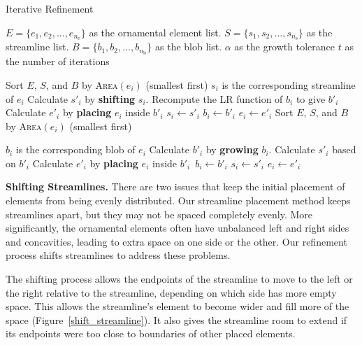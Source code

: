 \begin{algorithm}
\caption{Iterative Refinement} 
\label{iterative_refinement_algorithm}
\begin{algorithmic} 
\REQUIRE $E = \{ e_{1}, e_{2},... , e_{n_\mathrm{e}} \}$ as the ornamental element list. 
\REQUIRE $S = \{ s_{1}, s_{2},... , s_{n_\mathrm{s}} \}$ as the streamline list.
\REQUIRE $B = \{ b_{1}, b_{2},... , b_{n_\mathrm{b}} \}$ as the blob list.
\REQUIRE $\alpha$ as the growth tolerance
\REQUIRE $t$ as the number of iterations

  \STATE Sort $E$, $S$, and $B$ by \textsc{Area}$(e_{i})$ (smallest first)
  	\STATE $s_{i}$ is the corresponding streamline of $e_{i}$
    \STATE Calculate $s'_{i}$ by \textbf{shifting} $s_{i}$.
    \STATE Recompute the LR function of $b_{i}$ to give $b'_{i}$
    \STATE Calculate $e'_{i}$ by \textbf{placing} $e_{i}$ inside $b'_{i}$
        \STATE $s_{i} \leftarrow s'_{i}$
        \STATE $b_{i} \leftarrow b'_{i}$
    	\STATE $e_{i} \leftarrow e'_{i}$ 
    \ENDIF
  \ENDFOR
  \STATE Sort $E$, $S$, and $B$ by \textsc{Area}$(e_{i})$ (smallest first)

  	\STATE $b_{i}$ is the corresponding blob of $e_{i}$
    \STATE Calculate $b'_{i}$ by \textbf{growing} $b_{i}$.
    \STATE Calculate $s'_{i}$ based on $b'_{i}$ 
    \STATE Calculate $e'_{i}$ by \textbf{placing} $e_{i}$ inside $b'_{i}$\
    \STATE $b_{i} \leftarrow b'_{i}$
        \STATE $s_{i} \leftarrow s'_{i}$
    	\STATE $e_{i} \leftarrow e'_{i}$ 
    \ENDIF
  \ENDFOR

\ENDFOR
\end{algorithmic}
\end{algorithm}





\textbf{Shifting Streamlines.}
There are two issues that keep the initial placement of elements from being
evenly
distributed. Our streamline placement method keeps streamlines apart,
but they may not be spaced completely evenly. More significantly, the
ornamental elements often have unbalanced left and right sides and concavities,
leading to extra space on one side or the other.  Our refinement process
shifts streamlines to address these problems.

The shifting process allows the endpoints of the streamline to move to the
left or the right relative to the streamline, depending on which side has more empty space.
This allows the streamline's element to become wider and fill more of the space
(Figure~\ref{shift_streamline}). It also gives the streamline room to
extend if its endpoints were too close to boundaries of other placed
elements.

